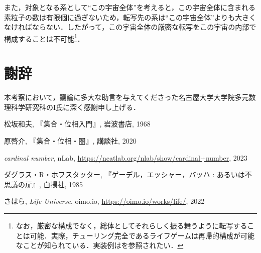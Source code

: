 \documentclass[10pt, a5paper, twoside]{jsarticle}
\theoremstyle{definition}
\begin{document}
		また，対象となる系として“この宇宙全体”を考えると，この宇宙全体に含まれる素粒子の数は有限個に過ぎないため，転写先の系は“この宇宙全体”よりも大きくなければならない．したがって，この宇宙全体の厳密な転写をこの宇宙の内部で構成することは不可能\footnote{なお，厳密な構成でなく，総体としてそれらしく振る舞うように転写することは可能．実際，チューリング完全であるライフゲームは再帰的構成が可能なことが知られている．実装例は\cite{shr}を参照されたい．}．

	\section{謝辞}

		本考察において，議論に多大な助言を与えてくださった名古屋大学大学院多元数理科学研究科のI氏に深く感謝申し上げる．

	\begin{thebibliography}{99}

		 松坂和夫, 『集合・位相入門』, 岩波書店, 1968

		 原啓介, 『集合・位相・圏』, 講談社, 2020

		 \textit{cardinal number}, nLab, \url{https://ncatlab.org/nlab/show/cardinal+number}, 2023

		 ダグラス・R・ホフスタッター, 『ゲーデル，エッシャー，バッハ : あるいは不思議の扉』, 白揚社, 1985

		 さはら, \textit{Life Universe}, oimo.io, \url{https://oimo.io/works/life/}, 2022

	\end{thebibliography}
\end{document}
